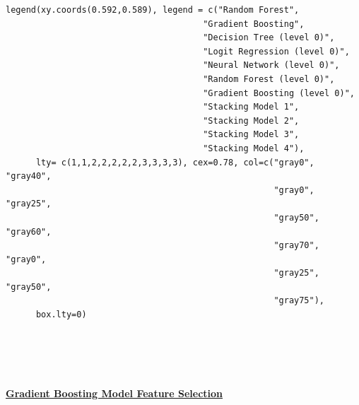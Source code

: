 \documentclass[12pt]{article}
\begin{document}
\begin{lstlisting}
legend(xy.coords(0.592,0.589), legend = c("Random Forest", 
                                       "Gradient Boosting", 
                                       "Decision Tree (level 0)",
                                       "Logit Regression (level 0)", 
                                       "Neural Network (level 0)", 
                                       "Random Forest (level 0)",
                                       "Gradient Boosting (level 0)",
                                       "Stacking Model 1",
                                       "Stacking Model 2", 
                                       "Stacking Model 3", 
                                       "Stacking Model 4"), 
      lty= c(1,1,2,2,2,2,2,3,3,3,3), cex=0.78, col=c("gray0", "gray40", 
                                                     "gray0", "gray25", 
                                                     "gray50", "gray60", 
                                                     "gray70", "gray0", 
                                                     "gray25", "gray50", 
                                                     "gray75"),
      box.lty=0)
       
       
       
       
\end{lstlisting}

\begin{algorithm}
\caption[Quantlet 2: Gradient Boosting Model Feature Selection]{\href{https://github.com/schreckf/NIC_Schreck/blob/master/code}{\color{Black}\large\textbf{Gradient Boosting Model Feature Selection}}}
\end{algorithm}
\end{document}
